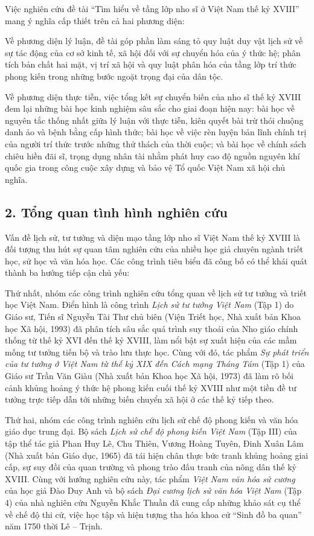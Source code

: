 Việc nghiên cứu đề tài ``Tìm hiểu về tầng lớp nho sĩ ở Việt Nam thế kỷ XVIII'' mang ý nghĩa cấp thiết trên cả hai phương diện:

Về phương diện lý luận, đề tài góp phần làm sáng tỏ quy luật duy vật lịch sử về sự tác động của cơ sở kinh tế, xã hội đối với sự chuyển hóa của ý thức hệ; phân tích bản chất hai mặt, vị trí xã hội và quy luật phân hóa của tầng lớp trí thức phong kiến trong những bước ngoặt trọng đại của dân tộc.

Về phương diện thực tiễn, việc tổng kết sự chuyển biến của nho sĩ thế kỷ XVIII đem lại những bài học kinh nghiệm sâu sắc cho giai đoạn hiện nay: bài học về nguyên tắc thống nhất giữa lý luận với thực tiễn, kiên quyết bài trừ thói chuộng danh ảo và bệnh bằng cấp hình thức; bài học về việc rèn luyện bản lĩnh chính trị của người trí thức trước những thử thách của thời cuộc; và bài học về chính sách chiêu hiền đãi sĩ, trọng dụng nhân tài nhằm phát huy cao độ nguồn nguyên khí quốc gia trong công cuộc xây dựng và bảo vệ Tổ quốc Việt Nam xã hội chủ nghĩa.

\subsection*{2. Tổng quan tình hình nghiên cứu}

Vấn đề lịch sử, tư tưởng và diện mạo tầng lớp nho sĩ Việt Nam thế kỷ XVIII là đối tượng thu hút sự quan tâm nghiên cứu của nhiều học giả chuyên ngành triết học, sử học và văn hóa học. Các công trình tiêu biểu đã công bố có thể khái quát thành ba hướng tiếp cận chủ yếu:

Thứ nhất, nhóm các công trình nghiên cứu tổng quan về lịch sử tư tưởng và triết học Việt Nam. Điển hình là công trình \textit{Lịch sử tư tưởng Việt Nam} (Tập 1) do Giáo sư, Tiến sĩ Nguyễn Tài Thư chủ biên (Viện Triết học, Nhà xuất bản Khoa học Xã hội, 1993) đã phân tích sâu sắc quá trình suy thoái của Nho giáo chính thống từ thế kỷ XVI đến thế kỷ XVIII, làm nổi bật sự xuất hiện của các mầm mống tư tưởng tiến bộ và trào lưu thực học. Cùng với đó, tác phẩm \textit{Sự phát triển của tư tưởng ở Việt Nam từ thế kỷ XIX đến Cách mạng Tháng Tám} (Tập 1) của Giáo sư Trần Văn Giàu (Nhà xuất bản Khoa học Xã hội, 1973) đã làm rõ bối cảnh khủng hoảng ý thức hệ phong kiến cuối thế kỷ XVIII như một tiền đề tư tưởng trực tiếp dẫn tới những biến chuyển xã hội ở các thế kỷ tiếp theo.

Thứ hai, nhóm các công trình nghiên cứu lịch sử chế độ phong kiến và văn hóa giáo dục trung đại. Bộ sách \textit{Lịch sử chế độ phong kiến Việt Nam} (Tập III) của tập thể tác giả Phan Huy Lê, Chu Thiên, Vương Hoàng Tuyên, Đinh Xuân Lâm (Nhà xuất bản Giáo dục, 1965) đã tái hiện chân thực bức tranh khủng hoảng giai cấp, sự suy đồi của quan trường và phong trào đấu tranh của nông dân thế kỷ XVIII. Cùng với hướng nghiên cứu này, tác phẩm \textit{Việt Nam văn hóa sử cương} của học giả Đào Duy Anh và bộ sách \textit{Đại cương lịch sử văn hóa Việt Nam} (Tập 4) của nhà nghiên cứu Nguyễn Khắc Thuần đã cung cấp những khảo sát cụ thể về chế độ thi cử, việc học tập và hiện tượng tha hóa khoa cử ``Sinh đồ ba quan'' năm 1750 thời Lê -- Trịnh.

